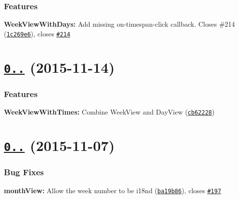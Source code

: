 \subsubsection*{Features}


\begin{DoxyItemize}
\item {\bfseries Week\+View\+With\+Days\+:} Add missing on-\/timespan-\/click callback. Closes \#214 (\href{https://github.com/mattlewis92/angular-bootstrap-calendar/commit/1c269e6}{\tt 1c269e6}), closes \href{https://github.com/mattlewis92/angular-bootstrap-calendar/issues/214}{\tt \#214}
\end{DoxyItemize}

\label{_0.17.0}%
 \section*{\href{https://github.com/mattlewis92/angular-bootstrap-calendar/compare/0.16.0...v0.17.0}{\tt 0..} (2015-\/11-\/14)}

\subsubsection*{Features}


\begin{DoxyItemize}
\item {\bfseries Week\+View\+With\+Times\+:} Combine Week\+View and Day\+View (\href{https://github.com/mattlewis92/angular-bootstrap-calendar/commit/cb62228}{\tt cb62228})
\end{DoxyItemize}

\label{_0.16.0}%
 \section*{\href{https://github.com/mattlewis92/angular-bootstrap-calendar/compare/0.15.5...v0.16.0}{\tt 0..} (2015-\/11-\/07)}

\subsubsection*{Bug Fixes}


\begin{DoxyItemize}
\item {\bfseries month\+View\+:} Allow the week number to be i18n\textquotesingle{}d (\href{https://github.com/mattlewis92/angular-bootstrap-calendar/commit/ba19b86}{\tt ba19b86}), closes \href{https://github.com/mattlewis92/angular-bootstrap-calendar/issues/197}{\tt \#197}
\end{DoxyItemize}

